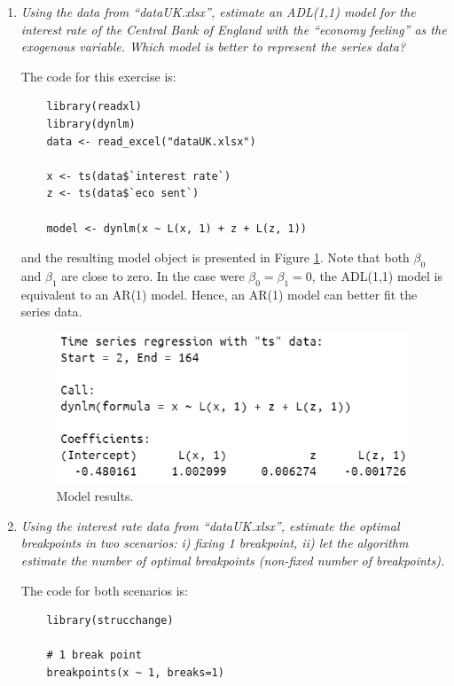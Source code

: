\documentclass[fleqn]{article}
\begin{document}
\begin{enumerate}
    \item \textit{Using the data from ``dataUK.xlsx'', estimate an ADL(1,1) model for the interest rate of the Central Bank of England with the ``economy feeling'' as the exogenous variable. Which model is better to represent the series data?}
    
    The code for this exercise is:
    \begin{verbatim}
    library(readxl)
    library(dynlm)
    data <- read_excel("dataUK.xlsx")
    
    x <- ts(data$`interest rate`)
    z <- ts(data$`eco sent`)
    
    model <- dynlm(x ~ L(x, 1) + z + L(z, 1))
    \end{verbatim}
    and the resulting model object is presented in Figure \ref{fig:model}. Note that both $\beta_0$ and $\beta_1$ are close to zero. In the case were $\beta_0=\beta_1=0$, the ADL(1,1) model is equivalent to an AR(1) model. Hence, an AR(1) model can better fit the series data.
    
    \begin{figure}[H]
        \centering
        \includegraphics[scale=0.7]{figs/model.png}
        \caption{Model results.}
        \label{fig:model}
    \end{figure}
    \item \textit{Using the interest rate data from ``dataUK.xlsx'', estimate the optimal breakpoints in two scenarios: i) fixing 1 breakpoint, ii) let the algorithm estimate the number of optimal breakpoints (non-fixed number of breakpoints).}
    
    The code for both scenarios is:
    \begin{verbatim}
    library(strucchange)
    
    # 1 break point
    breakpoints(x ~ 1, breaks=1)
    

\end{verbatim}
\end{enumerate}
\end{document}
